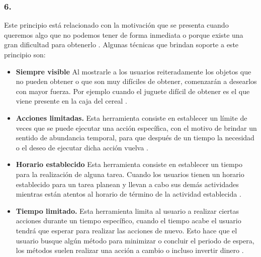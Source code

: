 \subsubsection{6. \principioVI} \label{subsec:principioVI}

 Este principio está relacionado con la motivación que se presenta cuando queremos algo
 que no podemos tener de forma inmediata  o porque existe una gran dificultad para obtenerlo
 \cite[p. 233]{Octalysis}. Algunas técnicas que brindan soporte a este principio son:

    \begin{itemize}
    \item
    {\bf Siempre visible} %
        Al mostrarle a los usuarios reiteradamente los objetos que no pueden obtener o que
        son muy difíciles de obtener, comenzarán a desearlos con mayor fuerza. Por ejemplo
        cuando el juguete difícil de obtener es el que viene presente en la caja del cereal
        \cite[p. 252]{Octalysis}.

    \item
    {\bf Acciones limitadas.} %
        Esta herramienta consiste en establecer un límite de veces que se puede ejecutar una
        acción específica, con el motivo de brindar un sentido de abundancia temporal, para
        que después de un tiempo la necesidad o el deseo de ejecutar dicha acción vuelva
        \cite[p. 256]{Octalysis}.

    \item
    {\bf Horario establecido} %
        Esta herramienta consiste en establecer un tiempo para la realización de alguna tarea.
        Cuando los usuarios tienen un horario establecido para un tarea planean y llevan a cabo
        sus demás actividades mientras están atentos al horario de término de la actividad
        establecida \cite[p. 258]{Octalysis}.

    \item
    {\bf Tiempo limitado.} %
        Esta herramienta limita al usuario a realizar ciertas acciones durante un tiempo
        específico, cuando el tiempo acabe el usuario tendrá que esperar para realizar las
        acciones de nuevo. Esto hace que el usuario busque algún método para minimizar o concluir
        el periodo de espera, los métodos suelen realizar una acción a cambio o incluso invertir
        dinero \cite[p. 261]{Octalysis}.
    \end{itemize}

